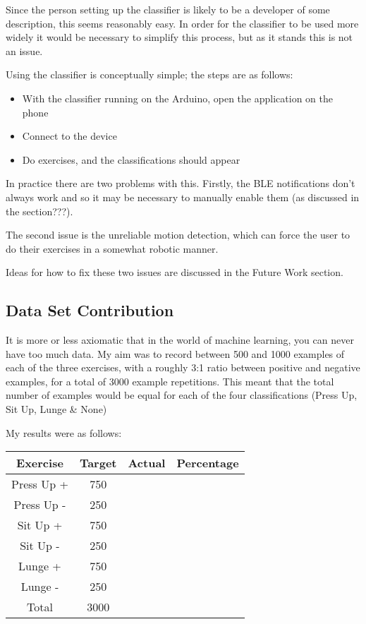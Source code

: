 \documentclass[a4paper]{article}
\begin{document}
Since the person setting up the classifier is likely to be a developer of some description, this seems reasonably easy. In order for the classifier to be used more widely it would be necessary to simplify this process, but as it stands this is not an issue.

Using the classifier is conceptually simple; the steps are as follows:

\begin{itemize}
\item With the classifier running on the Arduino, open the application on the phone
\item Connect to the device
\item Do exercises, and the classifications should appear
\end{itemize}

In practice there are two problems with this. Firstly, the BLE notifications don't always work and so it may be necessary to manually enable them (as discussed in the section???).

The second issue is the unreliable motion detection, which can force the user to do their exercises in a somewhat robotic manner. 

Ideas for how to fix these two issues are discussed in the Future Work section. 

\subsection{Data Set Contribution}

It is more or less axiomatic that in the world of machine learning, you can never have too much data. My aim was to record between 500 and 1000 examples of each of the three exercises, with a roughly 3:1 ratio between positive and negative examples, for a total of 3000 example repetitions. This meant that the total number of examples would be equal for each of the four classifications (Press Up, Sit Up, Lunge \& None)

My results were as follows:

\begin{center}
  \begin{tabular}{|c|c|c|c|}
      \hline
      Exercise & Target & Actual & Percentage \\
      \hline
      Press Up + & 750 & & \\
      \hline
      Press Up - & 250 & & \\
      \hline
      Sit Up + & 750 & & \\
      \hline
      Sit Up - & 250 & & \\
      \hline
      Lunge + & 750 & & \\
      \hline
      Lunge - & 250 & & \\
      \hline
      Total & 3000 & & \\
      \hline
      \end{tabular}
\end{center}
\end{document}
